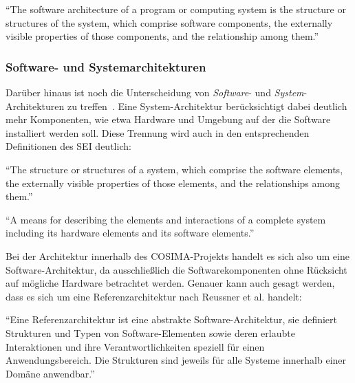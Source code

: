   \begin{definition}\label{def:architektur_bass_et_al}
    "`The software architecture of a program or computing system is the structure or structures of the system, which comprise software components, the externally visible properties of those components, and the relationship among them."'~\emph{\citep[S. 21]{software_architecture_in_practice}}
  \end{definition}
  
  
\subsubsection{Software- und Systemarchitekturen} %
\label{ssub:software_und_systemarchitekturen}

  Darüber hinaus ist noch die Unterscheidung von \emph{Software}- und \emph{System}-Architekturen zu treffen~\citep[S. xix]{evaluating_software_architectures}. Eine System-Architektur berücksichtigt dabei deutlich mehr Komponenten, wie etwa Hardware und Umgebung auf der die Software installiert werden soll. Diese Trennung wird auch in den entsprechenden Definitionen des SEI deutlich:
  
  \begin{definition}\label{def:software_architektur_sei}
    "`The structure or structures of a system, which comprise the software elements, the externally visible properties of those elements, and the relationships among them."'~\emph{\citep{sei_glossary}}
  \end{definition}
  
  \begin{definition}\label{def:system_architektur}
    "`A means for describing the elements and interactions of a complete system including its hardware elements and its software elements."'~\emph{\citep{sei_glossary}}
  \end{definition}

  Bei der Architektur innerhalb des COSIMA-Projekts handelt es sich also um eine Software-Architektur, da ausschließlich die Softwarekomponenten ohne Rücksicht auf mögliche Hardware betrachtet werden. Genauer kann auch gesagt werden, dass es sich um eine Referenzarchitektur nach Reussner et al. handelt:
  
  \begin{definition}[Referenzarchitektur]\label{def:referenzarchitektur}
    "`Eine Referenzarchitektur ist eine abstrakte Software-Architektur, sie definiert Strukturen und Typen von Software-Elementen sowie deren erlaubte Interaktionen und ihre Verantwortlichkeiten speziell für einen Anwendungsbereich. Die Strukturen sind jeweils für alle Systeme innerhalb einer Domäne anwendbar."'~\emph{\citep[S. 358]{handbuch_der_software_architektur}}
  \end{definition}
  

